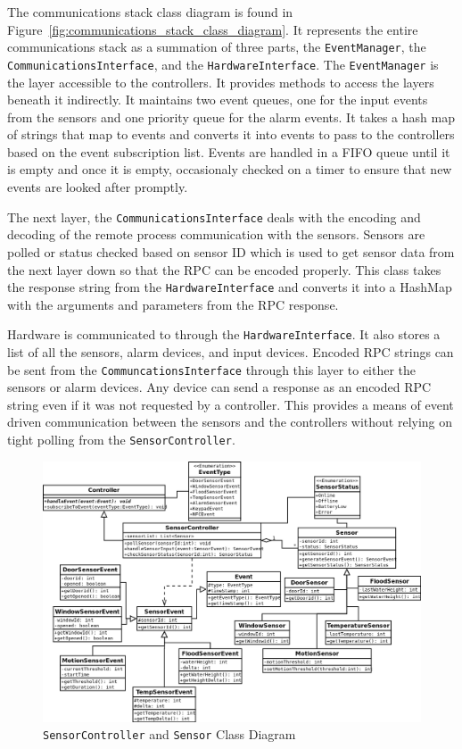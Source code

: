 \documentclass{report}
\begin{document}
The communications stack class diagram is found in
Figure~\ref{fig:communications_stack_class_diagram}. It represents the entire
communications stack as a summation of three parts, the \texttt{EventManager},
the \texttt{CommunicationsInterface}, and the \texttt{HardwareInterface}. The
\texttt{EventManager} is the layer accessible to the controllers. It provides
methods to access the layers beneath it indirectly. It maintains two event
queues, one for the input events from the sensors and one priority queue for
the alarm events. It takes a hash map of strings that map to events and
converts it into events to pass to the controllers based on the event
subscription list. Events are handled in a FIFO queue until it is empty and
once it is empty, occasionaly checked on a timer to ensure that new events are
looked after promptly.

The next layer, the \texttt{CommunicationsInterface} deals with the encoding
and decoding of the remote process communication with the sensors. Sensors are
polled or status checked based on sensor ID which is used to get sensor data
from the next layer down so that the RPC can be encoded properly. This class
takes the response string from the \texttt{HardwareInterface} and converts it
into a HashMap with the arguments and parameters from the RPC response.

Hardware is communicated to through the \texttt{HardwareInterface}. It also
stores a list of all the sensors, alarm devices, and input devices. Encoded RPC
strings can be sent from the \texttt{CommuncationsInterface} through this layer
to either the sensors or alarm devices. Any device can send a response as an
encoded RPC string even if it was not requested by a controller. This provides
a means of event driven communication between the sensors and the controllers
without relying on tight polling from the \texttt{SensorController}.
\begin{landscape} 
\begin{figure}[p]
    \caption{\texttt{SensorController} and \texttt{Sensor} Class Diagram}
    \label{fig:sensor_controller_class_diagram}
    \includegraphics[scale=0.5]{sensor_controller_class_diagram.png}
\end{figure}
\end{landscape} 
\end{document}
